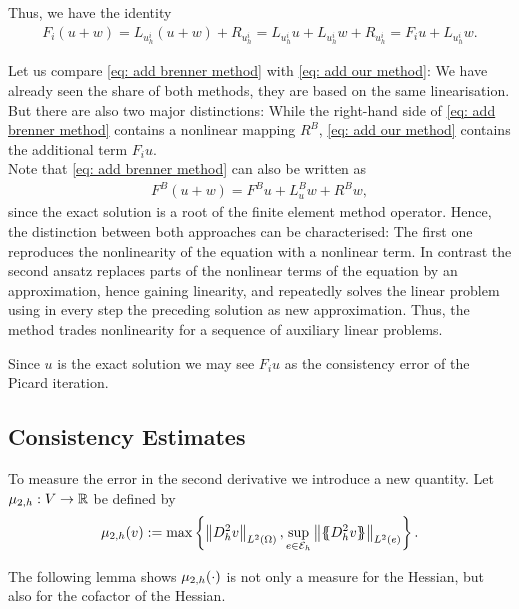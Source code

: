 Thus, we have the identity 
\begin{align}
	F_i(u+w) = L_{u^i_h} (u+w) + R_{u^i_h} = L_{u^i_h} u +L_{u^i_h}w + R_{u^i_h} = F_i u + L_{u^i_h}w. \label{eq: add our method}
\end{align}

Let us compare \eqref{eq: add brenner method} with \eqref{eq: add our method}: We have already seen the share of both methods, they are based on the same linearisation. 
But there are also two major distinctions: While the right-hand side of \eqref{eq: add brenner method} contains a nonlinear mapping $R^B$, \eqref{eq: add our method} contains the additional term $F_i u$. \\
Note that \eqref{eq: add brenner method} can also be written as 
 \begin{align*}
 F^B(u +w ) = F^B u + L^B_u w + R^Bw,
 \end{align*}
since the exact \MA solution is a root of the finite element method operator. 
Hence, the distinction between both approaches can be characterised: The first one reproduces the nonlinearity of the \MA equation with a nonlinear term. In contrast the second ansatz replaces parts of the nonlinear terms of the equation by an approximation, hence gaining linearity, and repeatedly solves the linear problem using in every step the preceding solution as new approximation. Thus, the method trades nonlinearity for a sequence of auxiliary linear problems. 

Since $u$ is the exact solution we may see $F_i u$ as the consistency error of the Picard iteration.

\subsection{Consistency Estimates}

To measure the error in the second derivative we introduce a new quantity. Let $\mu_{2,h}:V \rightarrow \mathbb{R}$ be defined by
\[
	\mu_{2,h}(v) := \operatorname{max} \left\{  \left\lVert D_h^2 v \right\rVert_{L^2(\Omega)},  \sup_{e \in \mathcal{E}_h} \left\lVert \{\!\!\{ D_h^2 v \}\!\!\} \right\rVert_{L^2(e)} \right\} .
\]	

The following lemma shows $\mu_{2,h}(\cdot)$ is not only a measure for the Hessian, but also for the cofactor of the Hessian.

